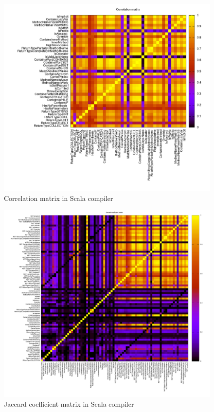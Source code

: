 \documentclass[12pt]{article}
\begin{document}
\begin{figure}[h]
\hspace*{-4cm}
\includegraphics[width=20cm]{images/corrCOR2.png}
\caption{Correlation matrix in Scala compiler}
\label{corrCor2}
\end{figure}
\begin{figure}[h]
\hspace*{-3,5cm}
\includegraphics[width=20cm]{images/corrJAC2.png}
\caption{Jaccard coefficient matrix in Scala compiler}
\label{corrJac2}
\end{figure}
\end{document}
